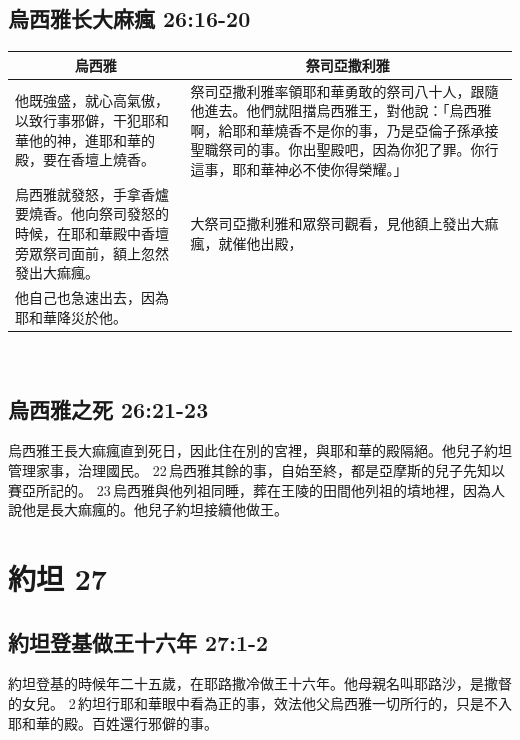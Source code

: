  


\subsection{烏西雅长大麻瘋 26:16-20}
\begin{table}[H]
\centering
\begin{tabular}{p{8.75cm}|p{}}\hline\hline
\multicolumn{1}{c|}{烏西雅}&\multicolumn{1}{c|}{祭司亞撒利雅}\\\hline
他既強盛，就心高氣傲，以致行事邪僻，干犯耶和華他的神，進耶和華的殿，要在香壇上燒香。
&祭司亞撒利雅率領耶和華勇敢的祭司八十人，跟隨他進去。他們就阻擋烏西雅王，對他說：「烏西雅啊，給耶和華燒香不是你的事，乃是亞倫子孫承接聖職祭司的事。你出聖殿吧，因為你犯了罪。你行這事，耶和華神必不使你得榮耀。」\\\hline 
烏西雅就發怒，手拿香爐要燒香。他向祭司發怒的時候，在耶和華殿中香壇旁眾祭司面前，額上忽然發出大痲瘋。&大祭司亞撒利雅和眾祭司觀看，見他額上發出大痲瘋，就催他出殿，\\\hline 
他自己也急速出去，因為耶和華降災於他。&\\\hline 
\end{tabular}
\end{table} 

\subsection{烏西雅之死 26:21-23}
烏西雅王長大痲瘋直到死日，因此住在別的宮裡，與耶和華的殿隔絕。他兒子約坦管理家事，治理國民。 22 烏西雅其餘的事，自始至終，都是亞摩斯的兒子先知以賽亞所記的。 23 烏西雅與他列祖同睡，葬在王陵的田間他列祖的墳地裡，因為人說他是長大痲瘋的。他兒子約坦接續他做王。

\section{約坦 27 }
\subsection{約坦登基做王十六年 27:1-2}
約坦登基的時候年二十五歲，在耶路撒冷做王十六年。他母親名叫耶路沙，是撒督的女兒。 2 約坦行耶和華眼中看為正的事，效法他父烏西雅一切所行的，只是不入耶和華的殿。百姓還行邪僻的事。

